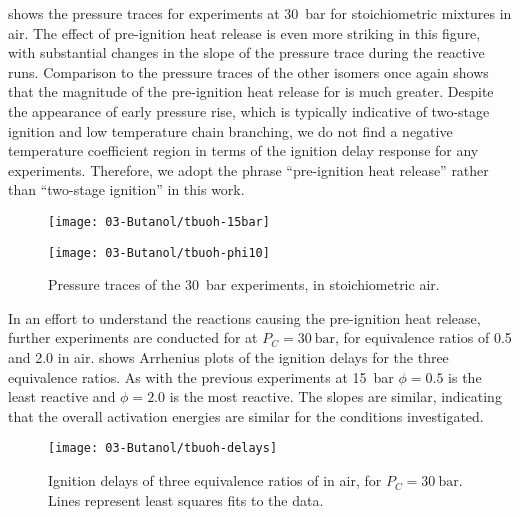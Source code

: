\documentclass[../main.tex]{subfiles}
\begin{document}
 shows the pressure traces for \tBuOH{}
experiments at \SI{30}{\bar} for stoichiometric mixtures in air. The effect of
pre-ignition heat release is even more striking in this figure, with
substantial changes in the slope of the pressure trace during the reactive
runs. Comparison to the pressure traces of the other isomers once again shows
that the magnitude of the pre-ignition heat release for \tBuOH{} is
much greater. Despite the appearance of early pressure rise, which is typically
indicative of two-stage ignition and low temperature chain branching, we do not
find a negative temperature coefficient region in terms of the ignition delay
response for any \tBuOH{} experiments. Therefore, we adopt the phrase
``pre-ignition heat release'' rather than ``two-stage ignition'' in this work.

\begin{figure}
    \begin{floatrow}
    \ffigbox
        {\texttt{[image: 03-Butanol/tbuoh-15bar]}}
        {\caption{Pressure traces of the \SI{15}{\bar} \tBuOH{} experiments,
            in stoichiometric air.}
        \label{fig:tbuoh-15bar}}
    \ffigbox
        {\texttt{[image: 03-Butanol/tbuoh-phi10]}}
        {\caption{Pressure traces of the \SI{30}{\bar} \tBuOH{} experiments,
            in stoichiometric air.}
        \label{fig:tbuoh-phi10}}
    \end{floatrow}
\end{figure}

In an effort to understand the reactions causing the pre-ignition heat release,
further experiments are conducted for \tBuOH{} at $P_C=\SI{30}{\bar}$, for
equivalence ratios of 0.5 and 2.0 in air.  shows
Arrhenius plots of the ignition delays for the three equivalence ratios. As
with the previous \nBuOH{} experiments at \SI{15}{\bar} \cite{Weber2011}
$\phi=\num{0.5}$ is the least reactive and $\phi=\num{2.0}$ is the most reactive. The
slopes are similar, indicating that the overall activation energies are similar
for the conditions investigated.

\begin{figure}
    \texttt{[image: 03-Butanol/tbuoh-delays]}
    \caption{Ignition delays of three equivalence ratios of \tBuOH{}
    in air, for $P_C=\SI{30}{\bar}$. Lines represent least squares fits to the data.}
    \label{fig:tbuoh-delays}
\end{figure}
\end{document}
